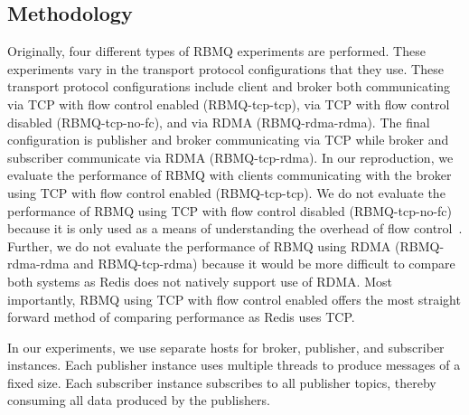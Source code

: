 \documentclass[letterpaper,twocolumn,10pt]{article}
\begin{document}
\subsection{Methodology}
Originally, four different types of RBMQ experiments are performed. These experiments vary in the transport protocol configurations that they use. These transport protocol configurations include client and broker both communicating via TCP with flow control enabled (RBMQ-tcp-tcp), via TCP with flow control disabled (RBMQ-tcp-no-fc), and via RDMA (RBMQ-rdma-rdma). The final configuration is publisher and broker communicating via TCP while broker and subscriber communicate via RDMA (RBMQ-tcp-rdma).
In our reproduction, we evaluate the performance of RBMQ with clients communicating with the broker using TCP with flow control enabled (RBMQ-tcp-tcp).
We do not evaluate the performance of RBMQ using TCP with flow control disabled (RBMQ-tcp-no-fc) because it is only used as a means of understanding the overhead of flow control~\cite{hoang2019building}.
Further, we do not evaluate the performance of RBMQ using RDMA (RBMQ-rdma-rdma and RBMQ-tcp-rdma) because it would be more difficult to compare both systems as Redis does not natively support use of RDMA.
Most importantly, RBMQ using TCP with flow control enabled offers the most straight forward method of comparing performance as Redis uses TCP.

In our experiments, we use separate hosts for broker, publisher, and subscriber instances. Each publisher instance uses multiple threads to produce messages of a fixed size. Each subscriber instance subscribes to all publisher topics, thereby consuming all data produced by the publishers.
\end{document}
